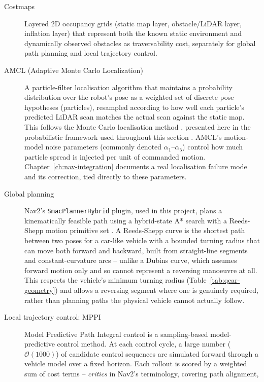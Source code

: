 \begin{description}
  \item[Costmaps] Layered 2D occupancy grids
    \cite{elfes1989occupancy} (static map layer, obstacle/LiDAR
    layer, inflation layer) that represent both the known static
    environment and dynamically observed obstacles as traversability
    cost, separately for global path planning and local trajectory
    control.
  \item[AMCL (Adaptive Monte Carlo Localization)] A particle-filter
    localisation algorithm that maintains a probability distribution
    over the robot's pose as a weighted set of discrete pose
    hypotheses (particles), resampled according to how well each
    particle's predicted LiDAR scan matches the actual scan against
    the static map. This follows the Monte Carlo localisation method
    \cite{dellaert1999mcl}, presented here in the probabilistic
    framework used throughout this section \cite{thrun2000probrob}.
    AMCL's motion-model noise parameters (commonly denoted
    $\alpha_1$--$\alpha_5$) control how much particle spread is
    injected per unit of commanded motion. Chapter~\ref{ch:nav-integration}
    documents a real localisation failure mode and its correction,
    tied directly to these parameters.
  \item[Global planning] Nav2's \texttt{SmacPlannerHybrid} plugin,
    used in this project, plans a kinematically feasible path using a
    hybrid-state A* search with a Reeds-Shepp motion primitive set
    \cite{dolgov2008hybridastar}. A Reeds-Shepp curve is the shortest
    path between two poses for a car-like vehicle with a bounded
    turning radius that can move both forward and backward, built from
    straight-line segments and constant-curvature arcs -- unlike a
    Dubins curve, which assumes forward motion only and so cannot
    represent a reversing manoeuvre at all. This respects the vehicle's
    minimum turning radius (Table~\ref{tab:qcar-geometry}) and allows a
    reversing segment where one is genuinely required, rather than
    planning paths the physical vehicle cannot actually follow.
  \item[Local trajectory control: MPPI] Model Predictive Path
    Integral control \cite{williams2015mppi} is a sampling-based
    model-predictive control method. At each control cycle, a large
    number ($\mathcal{O}(1000)$) of candidate control sequences are
    simulated forward through a vehicle model over a fixed horizon.
    Each rollout is scored by a weighted sum of cost terms --
    \emph{critics} in Nav2's terminology, covering path alignment,

\end{description}
